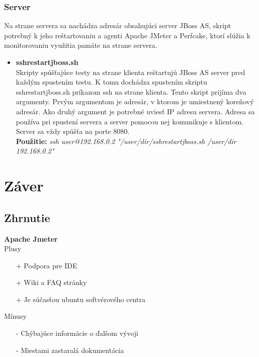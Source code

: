 \documentclass[12pt,oneside,final]{fithesis-utf8}
\newcommand\underscore[1]{\underline{\hspace{8pt}}}
\begin{document}
\newpage
\subsection{Server}
Na strane servera sa nachádza adresár obsahujúci server JBoss AS, skript potrebný k jeho reštartovaniu a agenti Apache JMeter a Perfcake, ktorí slúžia k monitorovaniu využitia pamäte na strane servera.

\begin{itemize}

\item \textbf{ssh\underscore{}restart\underscore{}jboss.sh}\\
Skripty spúšťajúce testy na strane klienta reštartujú JBoss AS server pred každým spustením testu. K tomu dochádza spustením skriptu ssh\underscore{}restart\underscore{}jboss.sh príkazom ssh na strane klienta. Tento skript prijíma dva argumenty. Prvým argumentom je adresár, v ktorom je umiestnený koreňový adresár. Ako druhý argument je potrebné uviesť IP adresu servera. Adresa sa používa pri spustení servera a server pomocou nej komunikuje s klientom. Server sa vždy spúšťa na porte 8080.\\
\textbf{Použitie:} \textit{ssh user@192.168.0.2 "/user/dir/ssh\underscore{}restart\underscore{}jboss.sh /user/dir 192.168.0.2"}
\end{itemize}


\chapter{Záver}


\section{Zhrnutie}

\textbf{Apache Jmeter}
\newline \\
Plusy
\begin{itemize}
\item[+] Podpora pre IDE
\item[+] Wiki a FAQ stránky
\item[+] Je súčasťou ubuntu softvérového centra \\
\end{itemize}

\noindent Mínusy
\begin{itemize}
\item[-] Chýbajúce informácie o ďalšom vývoji
\item[-] Miestami zastaralá dokumentácia \\
\end{itemize}
\end{document}
